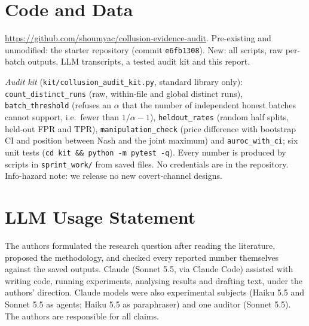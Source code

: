 \documentclass[10pt]{article}
\begin{document}
\section{Code and Data}\label{sec:code}
\url{https://github.com/shoumyac/collusion-evidence-audit}. Pre-existing and unmodified: the starter repository \cite{starter} (commit \texttt{e6fb1308}). New: all scripts, raw per-batch outputs, LLM transcripts, a tested audit kit and this report.

\emph{Audit kit} (\texttt{kit/collusion\_audit\_kit.py}, standard library only): \texttt{count\_distinct\_runs} (raw, within-file and global distinct runs), \texttt{batch\_threshold} (refuses an $\alpha$ that the number of independent honest batches cannot support, i.e.\ fewer than $1/\alpha-1$), \texttt{heldout\_rates} (random half splits, held-out FPR and TPR), \texttt{manipulation\_check} (price difference with bootstrap CI and position between Nash and the joint maximum) and \texttt{auroc\_with\_ci}; six unit tests (\texttt{cd kit \&\& python -m pytest -q}). Every number is produced by scripts in \texttt{sprint\_work/} from saved files. No credentials are in the repository. Info-hazard note: we release no new covert-channel designs.

\section*{LLM Usage Statement}
The authors formulated the research question after reading the literature, proposed the methodology, and checked every reported number themselves against the saved outputs. Claude (Sonnet 5.5, via Claude Code) assisted with writing code, running experiments, analysing results and drafting text, under the authors' direction. Claude models were also experimental subjects (Haiku 5.5 and Sonnet 5.5 as agents; Haiku 5.5 as paraphraser) and one auditor (Sonnet 5.5). The authors are responsible for all claims.
\end{document}
